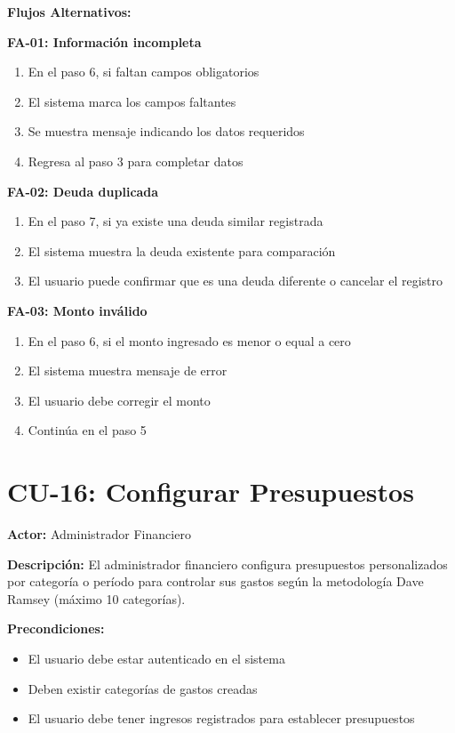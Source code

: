 \noindent\textbf{Flujos Alternativos:}

\textbf{FA-01: Información incompleta}
\begin{enumerate}
    \item En el paso 6, si faltan campos obligatorios
    \item El sistema marca los campos faltantes
    \item Se muestra mensaje indicando los datos requeridos
    \item Regresa al paso 3 para completar datos
\end{enumerate}

\textbf{FA-02: Deuda duplicada}
\begin{enumerate}
    \item En el paso 7, si ya existe una deuda similar registrada
    \item El sistema muestra la deuda existente para comparación
    \item El usuario puede confirmar que es una deuda diferente o cancelar el registro
\end{enumerate}

\textbf{FA-03: Monto inválido}
\begin{enumerate}
    \item En el paso 6, si el monto ingresado es menor o equal a cero
    \item El sistema muestra mensaje de error
    \item El usuario debe corregir el monto
    \item Continúa en el paso 5
\end{enumerate}

\section{CU-16: Configurar Presupuestos}

\noindent\textbf{Actor:} Administrador Financiero

\noindent\textbf{Descripción:} El administrador financiero configura presupuestos personalizados por categoría o período para controlar sus gastos según la metodología Dave Ramsey (máximo 10 categorías).

\noindent\textbf{Precondiciones:}
\begin{itemize}
    \item El usuario debe estar autenticado en el sistema
    \item Deben existir categorías de gastos creadas
    \item El usuario debe tener ingresos registrados para establecer presupuestos
\end{itemize}

